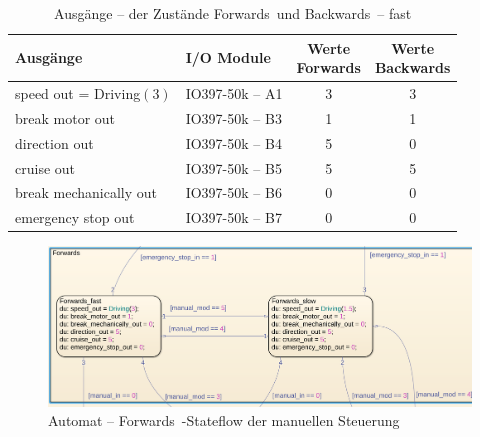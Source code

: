 \pagebreak[1]
\begin{table}[!ht]
	\centering
	\caption{Ausgänge – der Zustände \frqq Forwards\flqq\ und \frqq Backwards\flqq\ –  \frqq fast\flqq}
	\label{Automat_man:tab:z_V_schnell}
	\begin{tabular}{llcc}
		\hline
		\textbf{Ausgänge}                             & \textbf{I/O Module}                 & \makecell{\textbf{Werte}     \\ \textbf{\frqq Forwards\flqq}} & \makecell{\textbf{Werte}     \\ \textbf{\frqq Backwards\flqq}} \\ \hline
		\multicolumn{1}{l|}{speed out = Driving$(3)$} & \multicolumn{1}{l|}{IO397-50k – A1} & 3                        & 3 \\
		\multicolumn{1}{l|}{break motor out}          & \multicolumn{1}{l|}{IO397-50k – B3} & 1                        & 1 \\
		\multicolumn{1}{l|}{direction out}            & \multicolumn{1}{l|}{IO397-50k – B4} & 5                        & 0 \\
		\multicolumn{1}{l|}{cruise out}               & \multicolumn{1}{l|}{IO397-50k – B5} & 5                        & 5 \\
		\multicolumn{1}{l|}{break mechanically out}   & \multicolumn{1}{l|}{IO397-50k – B6} & 0                        & 0 \\
		\multicolumn{1}{l|}{emergency stop out}       & \multicolumn{1}{l|}{IO397-50k – B7} & 0                        & 0 \\ \hline
	\end{tabular}
\end{table}
\pagebreak[1]

\pagebreak[1]
\begin{figure}[!ht]
	\begin{center}
		\includegraphics[width=\textwidth]{img/5_simulation/Automat_man_vorwaerts.png}
		\caption{Automat – \frqq Forwards\flqq\ -Stateflow der manuellen Steuerung}
		\label{Automat_man:img:man_vorwärts}
	\end{center}
\end{figure}
\pagebreak[1]



